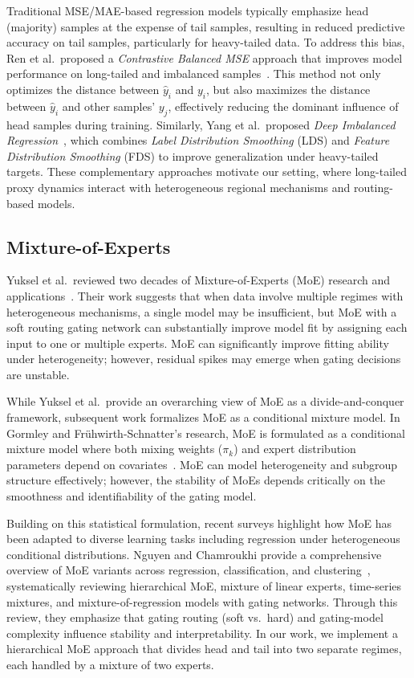 \documentclass[pdflatex,sn-basic,Numbered]{sn-jnl}
\begin{document}
Traditional MSE/MAE-based regression models typically emphasize head (majority) samples at the expense of tail samples, resulting in reduced predictive accuracy on tail samples, particularly for heavy-tailed data. To address this bias, Ren et al.\ proposed a \emph{Contrastive Balanced MSE} approach that improves model performance on long-tailed and imbalanced samples~\cite{ren2022balancedmse}. This method not only optimizes the distance between $\hat{y}_i$ and $y_i$, but also maximizes the distance between $\hat{y}_i$ and other samples' $y_j$, effectively reducing the dominant influence of head samples during training. Similarly, Yang et al.\ proposed \emph{Deep Imbalanced Regression}~\cite{yang2021dir}, which combines \emph{Label Distribution Smoothing} (LDS) and \emph{Feature Distribution Smoothing} (FDS) to improve generalization under heavy-tailed targets. These complementary approaches motivate our setting, where long-tailed proxy dynamics interact with heterogeneous regional mechanisms and routing-based models.

\subsection{Mixture-of-Experts}

Yuksel et al.\ reviewed two decades of Mixture-of-Experts (MoE) research and applications~\cite{yuksel2012twenty}. Their work suggests that when data involve multiple regimes with heterogeneous mechanisms, a single model may be insufficient, but MoE with a soft routing gating network can substantially improve model fit by assigning each input to one or multiple experts. MoE can significantly improve fitting ability under heterogeneity; however, residual spikes may emerge when gating decisions are unstable.

While Yuksel et al.\ provide an overarching view of MoE as a divide-and-conquer framework, subsequent work formalizes MoE as a conditional mixture model. In Gormley and Frühwirth-Schnatter's research, MoE is formulated as a conditional mixture model where both mixing weights ($\pi_k$) and expert distribution parameters depend on covariates~\cite{gormley2018moe}. MoE can model heterogeneity and subgroup structure effectively; however, the stability of MoEs depends critically on the smoothness and identifiability of the gating model.

Building on this statistical formulation, recent surveys highlight how MoE has been adapted to diverse learning tasks including regression under heterogeneous conditional distributions. Nguyen and Chamroukhi provide a comprehensive overview of MoE variants across regression, classification, and clustering~\cite{nguyen2018overviewmoe}, systematically reviewing hierarchical MoE, mixture of linear experts, time-series mixtures, and mixture-of-regression models with gating networks. Through this review, they emphasize that gating routing (soft vs.\ hard) and gating-model complexity influence stability and interpretability. In our work, we implement a hierarchical MoE approach that divides head and tail into two separate regimes, each handled by a mixture of two experts.
\end{document}
